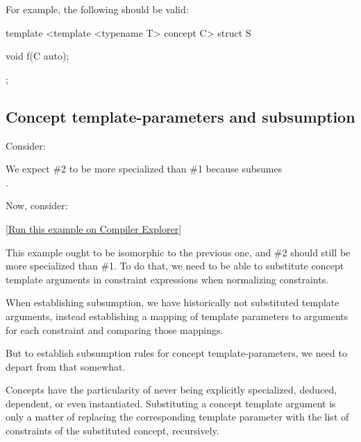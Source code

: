 \documentclass{wg21}
\begin{document}
For example, the following should be valid:

\begin{colorblock}
template <template <typename T> concept C>
struct S {
    void f(C auto);

};
\end{colorblock}

\subsection{Concept template-parameters and subsumption}

Consider:

We expect \#2 to be more specialized than \#1 because  subsumes\\
.

Now, consider:


[\href{https://compiler-explorer.com/z/71qjW1WWP}{Run this example on Compiler Explorer}]

This example ought to be isomorphic to the previous one, and \#2 should still be more specialized than \#1.
To do that, we need to be able to substitute concept template arguments in constraint expressions when normalizing constraints.

When establishing subsumption, we have historically not substituted template arguments, instead establishing a mapping of template parameters to arguments for each
constraint and comparing those mappings.

But to establish subsumption rules for concept template-parameters, we need to depart from that somewhat.

Concepts have the particularity of never being explicitly specialized, deduced, dependent, or even instantiated.
Substituting a concept template argument is only a matter of replacing the corresponding template parameter with the list of constraints of the substituted
concept, recursively.
\end{document}
